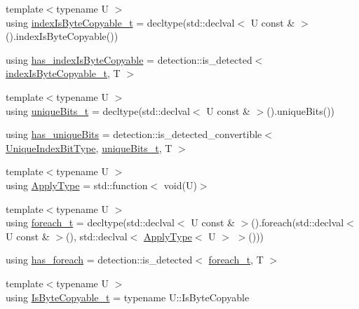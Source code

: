 \begin{DoxyCompactItemize}
{\footnotesize template$<$typename U $>$ }\\using \hyperlink{structvt_1_1index_1_1_index_traits_a67b716eec3bb224751d83b4f1e4d61fc}{index\+Is\+Byte\+Copyable\+\_\+t} = decltype(std\+::declval$<$ U const  \& $>$().index\+Is\+Byte\+Copyable())
\item 
using \hyperlink{structvt_1_1index_1_1_index_traits_ab2daf95703112e971bfc12704a1fa141}{has\+\_\+index\+Is\+Byte\+Copyable} = detection\+::is\+\_\+detected$<$ \hyperlink{structvt_1_1index_1_1_index_traits_a67b716eec3bb224751d83b4f1e4d61fc}{index\+Is\+Byte\+Copyable\+\_\+t}, T $>$
\item 
{\footnotesize template$<$typename U $>$ }\\using \hyperlink{structvt_1_1index_1_1_index_traits_ac56a2e3919488b64e42a60e1684623aa}{unique\+Bits\+\_\+t} = decltype(std\+::declval$<$ U const  \& $>$().unique\+Bits())
\item 
using \hyperlink{structvt_1_1index_1_1_index_traits_a6862d0422947a4835262b170637b462d}{has\+\_\+unique\+Bits} = detection\+::is\+\_\+detected\+\_\+convertible$<$ \hyperlink{namespacevt_a913e1f07b5228dd8bb64040dc6dcea14}{Unique\+Index\+Bit\+Type}, \hyperlink{structvt_1_1index_1_1_index_traits_ac56a2e3919488b64e42a60e1684623aa}{unique\+Bits\+\_\+t}, T $>$
\item 
{\footnotesize template$<$typename U $>$ }\\using \hyperlink{structvt_1_1index_1_1_index_traits_ab13467c0c40bb0f17103d108cd08437f}{Apply\+Type} = std\+::function$<$ void(U)$>$
\item 
{\footnotesize template$<$typename U $>$ }\\using \hyperlink{structvt_1_1index_1_1_index_traits_a132ed4a131bbc5f9e410e203cf2e08ae}{foreach\+\_\+t} = decltype(std\+::declval$<$ U const  \& $>$().foreach(std\+::declval$<$ U const  \& $>$(), std\+::declval$<$ \hyperlink{structvt_1_1index_1_1_index_traits_ab13467c0c40bb0f17103d108cd08437f}{Apply\+Type}$<$ U $>$ $>$()))
\item 
using \hyperlink{structvt_1_1index_1_1_index_traits_ae82fe931c4bbe8201d4dc72f07ceb42d}{has\+\_\+foreach} = detection\+::is\+\_\+detected$<$ \hyperlink{structvt_1_1index_1_1_index_traits_a132ed4a131bbc5f9e410e203cf2e08ae}{foreach\+\_\+t}, T $>$
\item 
{\footnotesize template$<$typename U $>$ }\\using \hyperlink{structvt_1_1index_1_1_index_traits_a6869472628098b68d1ce678422814734}{Is\+Byte\+Copyable\+\_\+t} = typename U\+::\+Is\+Byte\+Copyable

\end{DoxyCompactItemize}
